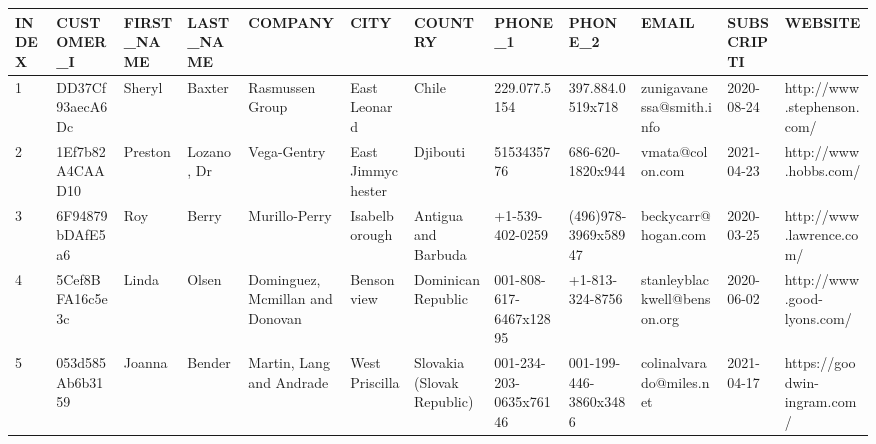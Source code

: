 \documentclass[11pt,a4paper]{article}
\begin{document}
\begin{table}[h]
\begin{tabular}{|l|l|l|l|l|l|l|l|l|l|l|l|}
\hline
INDEX & CUSTOMER\_I & FIRST\_NAME & LAST\_NAME & COMPANY & CITY & COUNTRY & PHONE\_1 & PHONE\_2 & EMAIL & SUBSCRIPTI & WEBSITE \\ \hline
1 & DD37Cf93aecA6Dc & Sheryl & Baxter & Rasmussen Group & East Leonard & Chile & 229.077.5154 & 397.884.0519x718 & zunigavanessa@smith.info & 2020-08-24 & http://www.stephenson.com/ \\ \hline
2 & 1Ef7b82A4CAAD10 & Preston & Lozano, Dr & Vega-Gentry & East Jimmychester & Djibouti & 5153435776 & 686-620-1820x944 & vmata@colon.com & 2021-04-23 & http://www.hobbs.com/ \\ \hline
3 & 6F94879bDAfE5a6 & Roy & Berry & Murillo-Perry & Isabelborough & Antigua and Barbuda & +1-539-402-0259 & (496)978-3969x58947 & beckycarr@hogan.com & 2020-03-25 & http://www.lawrence.com/ \\ \hline
4 & 5Cef8BFA16c5e3c & Linda & Olsen & Dominguez, Mcmillan and Donovan & Bensonview & Dominican Republic & 001-808-617-6467x12895 & +1-813-324-8756 & stanleyblackwell@benson.org & 2020-06-02 & http://www.good-lyons.com/ \\ \hline
5 & 053d585Ab6b3159 & Joanna & Bender & Martin, Lang and Andrade & West Priscilla & Slovakia (Slovak Republic) & 001-234-203-0635x76146 & 001-199-446-3860x3486 & colinalvarado@miles.net & 2021-04-17 & https://goodwin-ingram.com/ \\ \hline
\end{tabular}
\end{table}
\end{document}

